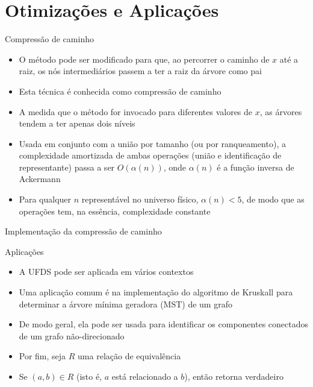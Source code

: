 \section{Otimizações e Aplicações}

\begin{frame}[fragile]{Compressão de caminho}

    \begin{itemize}
        \item O método  pode ser modificado para que, ao percorrer o
            caminho de $x$ até a raiz, os nós intermediários passem a ter a raiz da árvore 
            como pai

        \item Esta técnica é conhecida como compressão de caminho

        \item A medida que o método for invocado para diferentes valores de $x$, as árvores tendem
            a ter apenas dois níveis

        \item Usada em conjunto com a união por tamanho (ou por ranqueamento), a complexidade 
            amortizada de
            ambas operações (união e identificação de representante) passa a ser $O(\alpha(n))$,
            onde $\alpha(n)$ é a função inversa de Ackermann

        \item Para qualquer $n$ representável no universo físico, $\alpha(n) < 5$, de modo que
            as operações tem, na essência, complexidade constante
    \end{itemize}

\end{frame}



\begin{frame}[fragile]{Implementação da compressão de caminho}
\end{frame}

\begin{frame}[fragile]{Aplicações}

    \begin{itemize}
        \item A UFDS pode ser aplicada em vários contextos

        \item Uma aplicação comum é na implementação do algoritmo de Kruskall para determinar a
            árvore mínima geradora (MST) de um grafo

        \item De modo geral, ela pode ser usada para identificar os componentes conectados de
            um grafo não-direcionado

        \item Por fim, seja $R$ uma relação de equivalência

        \item Se $(a, b)\in R$ (isto é, $a$ está relacionado a $b$), então 
             retorna verdadeiro
    \end{itemize}

\end{frame}
